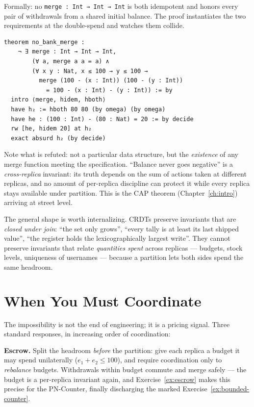 \documentclass[12pt, a4paper, openright]{book}
\theoremstyle{thmstyle}
\theoremstyle{defstyle}
\newcommand{\lc}[1]{\texttt{#1}}
\newcounter{refutation}[chapter]
\renewcommand{\therefutation}{\thechapter.\arabic{refutation}}
\newenvironment{refutedbox}[1]{%
  \refstepcounter{refutation}%
  \begin{tcolorbox}[refutedbox,
    title={Refuted \therefutation\ --- #1}]%
}{\end{tcolorbox}}
\begin{document}
\begin{refutedbox}{There is a merge for non-negative bank accounts}
\label{ref:bank}
  Formally: no \lc{merge : Int → Int → Int} is both idempotent and
  honors every pair of withdrawals from a shared initial balance.
  The proof instantiates the two requirements at the double-spend and
  watches them collide.
\begin{verbatim}
theorem no_bank_merge :
    ¬ ∃ merge : Int → Int → Int,
        (∀ a, merge a a = a) ∧
        (∀ x y : Nat, x ≤ 100 → y ≤ 100 →
          merge (100 - (x : Int)) (100 - (y : Int))
            = 100 - (x : Int) - (y : Int)) := by
  intro ⟨merge, hidem, hboth⟩
  have h₂ := hboth 80 80 (by omega) (by omega)
  have he : (100 : Int) - (80 : Nat) = 20 := by decide
  rw [he, hidem 20] at h₂
  exact absurd h₂ (by decide)
\end{verbatim}
  Note what is refuted: not a particular data structure, but the
  \emph{existence} of any merge function meeting the specification.
  ``Balance never goes negative'' is a \emph{cross-replica} invariant:
  its truth depends on the sum of actions taken at different replicas,
  and no amount of per-replica discipline can protect it while every
  replica stays available under partition. This is the CAP theorem
  (Chapter~\ref{ch:intro}) arriving at street level.
\end{refutedbox}

The general shape is worth internalizing. CRDTs preserve invariants that
are \emph{closed under join}: ``the set only grows'', ``every tally is
at least its last shipped value'', ``the register holds the
lexicographically largest write''. They cannot preserve invariants that
relate \emph{quantities spent} across replicas --- budgets, stock
levels, uniqueness of usernames --- because a partition lets both sides
spend the same headroom.

\section{When You Must Coordinate}

The impossibility is not the end of engineering; it is a pricing signal.
Three standard responses, in increasing order of coordination:

\textbf{Escrow.} Split the headroom \emph{before} the partition: give
each replica a budget it may spend unilaterally
($e_1 + e_2 \le 100$), and require coordination only to \emph{rebalance}
budgets. Withdrawals within budget commute and merge safely --- the
budget is a per-replica invariant again, and
Exercise~\ref{ex:escrow} makes this precise for the PN-Counter,
finally discharging the marked
Exercise~\ref{ex:bounded-counter}.
\end{document}
